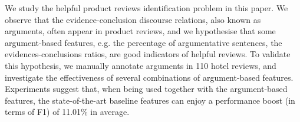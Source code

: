 We study the helpful product reviews identification problem in this paper. We observe that the evidence-conclusion discourse relations, also known as arguments, often appear in product reviews, and we hypothesise that some argument-based features, e.g. the percentage of argumentative sentences, the evidences-conclusions ratios, are good indicators of helpful reviews. To validate this hypothesis, we manually annotate arguments in 110 hotel reviews, and investigate the effectiveness of several combinations of argument-based features. Experiments suggest that, when being used together with the argument-based features, the state-of-the-art baseline features can enjoy a performance boost (in terms of F1) of 11.01\% in average.
